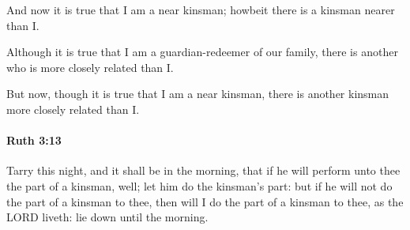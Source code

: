 			\begin{versebox}
					\item[BHS] 
					\item[LXX] 
					\item[ASV] And now it is true that I am a near kinsman; howbeit there is a kinsman nearer than I.
					\item[NIV] Although it is true that I am a guardian-redeemer of our family, there is another who is more closely related than I.
					\item[NRSV] But now, though it is true that I am a near kinsman, there is another kinsman more closely related than I.
			\end{versebox}

		\paragraph{Ruth 3:13} %
			\label{RUTH-3-13}

			Tarry this night, and it shall be in the morning, that if he will perform unto thee the part of a kinsman, well; let him do the kinsman’s part: but if he will not do the part of a kinsman to thee, then will I do the part of a kinsman to thee, as the LORD liveth: lie down until the morning.

